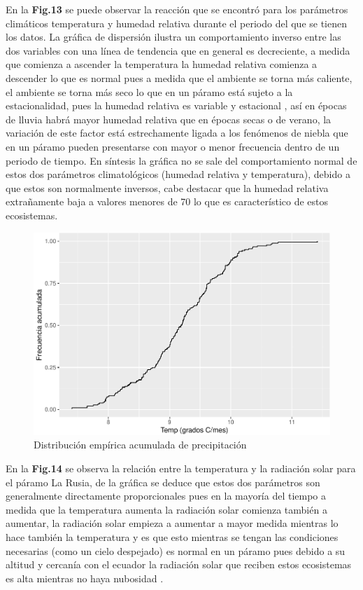 \documentclass[conference,final,]{IEEEtran}
\makeatletter
\def\maxwidth{\ifdim\Gin@nat@width>\linewidth\linewidth
\else\Gin@nat@width\fi}
\let\Oldincludegraphics\includegraphics
\renewcommand{\includegraphics}[1]{\Oldincludegraphics[width=\maxwidth]{#1}}
\makeatother
\begin{document}
En la \textbf{Fig.13} se puede observar la reacción que se encontró para
los parámetros climáticos temperatura y humedad relativa durante el
periodo del que se tienen los datos. La gráfica de dispersión ilustra un
comportamiento inverso entre las dos variables con una línea de
tendencia que en general es decreciente, a medida que comienza a
ascender la temperatura la humedad relativa comienza a descender lo que
es normal pues a medida que el ambiente se torna más caliente, el
ambiente se torna más seco lo que en un páramo está sujeto a la
estacionalidad, pues la humedad relativa es variable y estacional
\cite{hofstede2017p}, así en épocas de lluvia habrá mayor humedad
relativa que en épocas secas o de verano, la variación de este factor
está estrechamente ligada a los fenómenos de niebla que en un páramo
pueden presentarse con mayor o menor frecuencia dentro de un periodo de
tiempo. En síntesis la gráfica no se sale del comportamiento normal de
estos dos parámetros climatológicos (humedad relativa y temperatura),
debido a que estos son normalmente inversos, cabe destacar que la
humedad relativa extrañamente baja a valores menores de 70 lo que es
característico de estos ecosistemas. \cite{hofstede2017p}

\begin{figure}
\centering
\includegraphics{Hidrology_files/figure-latex/unnamed-chunk-22-1.pdf}
\caption{Distribución empírica acumulada de precipitación}
\end{figure}

En la \textbf{Fig.14} se observa la relación entre la temperatura y la
radiación solar para el páramo La Rusia, de la gráfica se deduce que
estos dos parámetros son generalmente directamente proporcionales pues
en la mayoría del tiempo a medida que la temperatura aumenta la
radiación solar comienza también a aumentar, la radiación solar empieza
a aumentar a mayor medida mientras lo hace también la temperatura y es
que esto mientras se tengan las condiciones necesarias (como un cielo
despejado) es normal en un páramo pues debido a su altitud y cercanía
con el ecuador la radiación solar que reciben estos ecosistemas es alta
mientras no haya nubosidad \cite{montenegro2015estimacion}.
\end{document}
